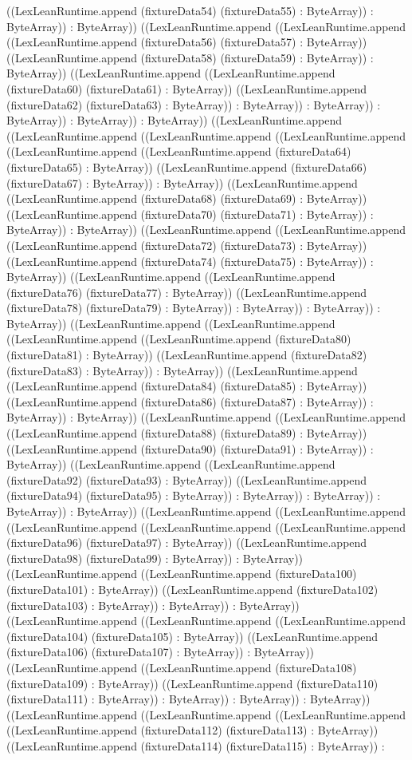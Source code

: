 \documentclass[11pt]{article}
\begin{document}
((LexLeanRuntime.append (fixtureData54) (fixtureData55) : ByteArray)) : ByteArray)) : ByteArray)) ((LexLeanRuntime.append ((LexLeanRuntime.append ((LexLeanRuntime.append (fixtureData56) (fixtureData57) : ByteArray)) ((LexLeanRuntime.append (fixtureData58) (fixtureData59) : ByteArray)) : ByteArray)) ((LexLeanRuntime.append ((LexLeanRuntime.append (fixtureData60) (fixtureData61) : ByteArray)) ((LexLeanRuntime.append (fixtureData62) (fixtureData63) : ByteArray)) : ByteArray)) : ByteArray)) : ByteArray)) : ByteArray)) : ByteArray)) ((LexLeanRuntime.append ((LexLeanRuntime.append ((LexLeanRuntime.append ((LexLeanRuntime.append ((LexLeanRuntime.append ((LexLeanRuntime.append (fixtureData64) (fixtureData65) : ByteArray)) ((LexLeanRuntime.append (fixtureData66) (fixtureData67) : ByteArray)) : ByteArray)) ((LexLeanRuntime.append ((LexLeanRuntime.append (fixtureData68) (fixtureData69) : ByteArray)) ((LexLeanRuntime.append (fixtureData70) (fixtureData71) : ByteArray)) : ByteArray)) : ByteArray)) ((LexLeanRuntime.append ((LexLeanRuntime.append ((LexLeanRuntime.append (fixtureData72) (fixtureData73) : ByteArray)) ((LexLeanRuntime.append (fixtureData74) (fixtureData75) : ByteArray)) : ByteArray)) ((LexLeanRuntime.append ((LexLeanRuntime.append (fixtureData76) (fixtureData77) : ByteArray)) ((LexLeanRuntime.append (fixtureData78) (fixtureData79) : ByteArray)) : ByteArray)) : ByteArray)) : ByteArray)) ((LexLeanRuntime.append ((LexLeanRuntime.append ((LexLeanRuntime.append ((LexLeanRuntime.append (fixtureData80) (fixtureData81) : ByteArray)) ((LexLeanRuntime.append (fixtureData82) (fixtureData83) : ByteArray)) : ByteArray)) ((LexLeanRuntime.append ((LexLeanRuntime.append (fixtureData84) (fixtureData85) : ByteArray)) ((LexLeanRuntime.append (fixtureData86) (fixtureData87) : ByteArray)) : ByteArray)) : ByteArray)) ((LexLeanRuntime.append ((LexLeanRuntime.append ((LexLeanRuntime.append (fixtureData88) (fixtureData89) : ByteArray)) ((LexLeanRuntime.append (fixtureData90) (fixtureData91) : ByteArray)) : ByteArray)) ((LexLeanRuntime.append ((LexLeanRuntime.append (fixtureData92) (fixtureData93) : ByteArray)) ((LexLeanRuntime.append (fixtureData94) (fixtureData95) : ByteArray)) : ByteArray)) : ByteArray)) : ByteArray)) : ByteArray)) ((LexLeanRuntime.append ((LexLeanRuntime.append ((LexLeanRuntime.append ((LexLeanRuntime.append ((LexLeanRuntime.append (fixtureData96) (fixtureData97) : ByteArray)) ((LexLeanRuntime.append (fixtureData98) (fixtureData99) : ByteArray)) : ByteArray)) ((LexLeanRuntime.append ((LexLeanRuntime.append (fixtureData100) (fixtureData101) : ByteArray)) ((LexLeanRuntime.append (fixtureData102) (fixtureData103) : ByteArray)) : ByteArray)) : ByteArray)) ((LexLeanRuntime.append ((LexLeanRuntime.append ((LexLeanRuntime.append (fixtureData104) (fixtureData105) : ByteArray)) ((LexLeanRuntime.append (fixtureData106) (fixtureData107) : ByteArray)) : ByteArray)) ((LexLeanRuntime.append ((LexLeanRuntime.append (fixtureData108) (fixtureData109) : ByteArray)) ((LexLeanRuntime.append (fixtureData110) (fixtureData111) : ByteArray)) : ByteArray)) : ByteArray)) : ByteArray)) ((LexLeanRuntime.append ((LexLeanRuntime.append ((LexLeanRuntime.append ((LexLeanRuntime.append (fixtureData112) (fixtureData113) : ByteArray)) ((LexLeanRuntime.append (fixtureData114) (fixtureData115) : ByteArray)) : 
\end{document}
